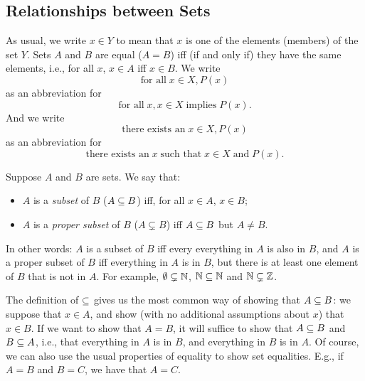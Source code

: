 \subsection{Relationships between Sets}

As usual, we write $x\in Y$
%
%
%
%
to mean that $x$ is one of the elements (members) of the set $Y$.
Sets $A$ and $B$ are equal ($A=B$)
%
%
%
%
iff (if and only if) they have the same elements, i.e., for all $x$,
%
$x\in A$ iff $x\in B$.
We write
\begin{displaymath}
  \textrm{for all}\; x \in X, P(x)
\end{displaymath}
as an abbreviation for
\begin{displaymath}
  \textrm{for all}\; x, x\in X \mathbin{\textrm{implies}} P(x) .
\end{displaymath}
And we write 
\begin{displaymath}
  \textrm{there exists an}\; x \in X, P(x)
\end{displaymath}
as an abbreviation for
\begin{displaymath}
  \textrm{there exists an}\; x \;\textrm{such that}\; x\in X
  \mathbin{\textrm{and}} P(x) .
\end{displaymath}

Suppose $A$ and $B$ are sets.  We say that:
\begin{itemize}
\item $A$ is a \emph{subset}
%
%
of $B$ ($A\subseteq B$)
%
%
iff, for all $x\in A$, $x\in B$;

\item $A$ is a
\emph{proper subset}
%
%
%
of $B$ ($A\subsetneq B$)
%
%
iff $A\subseteq B$ but $A\neq B$.
\end{itemize}
In other words: $A$ is a subset of $B$ iff every everything in $A$ is
also in $B$, and $A$ is a proper subset of $B$ iff everything in $A$
is in $B$, but there is at least one element of $B$ that is not in
$A$. For example, $\emptyset\subsetneq\mathbb{N}$, $\mathbb{N}\subseteq\mathbb{N}$ and
$\mathbb{N}\subsetneq\mathbb{Z}$.

The definition of $\subseteq$ gives us the most common way of showing that
$A\subseteq B$: we suppose that $x\in A$, and show (with no additional
assumptions about $x$) that $x\in B$.  If we want to show that $A=B$,
it will suffice to show that $A\subseteq B$ and $B\subseteq A$, i.e., that
everything in $A$ is in $B$, and everything in $B$ is in $A$.  Of
course, we can also use the usual properties of equality to show set
equalities.  E.g., if $A=B$ and $B=C$, we have that $A=C$.

